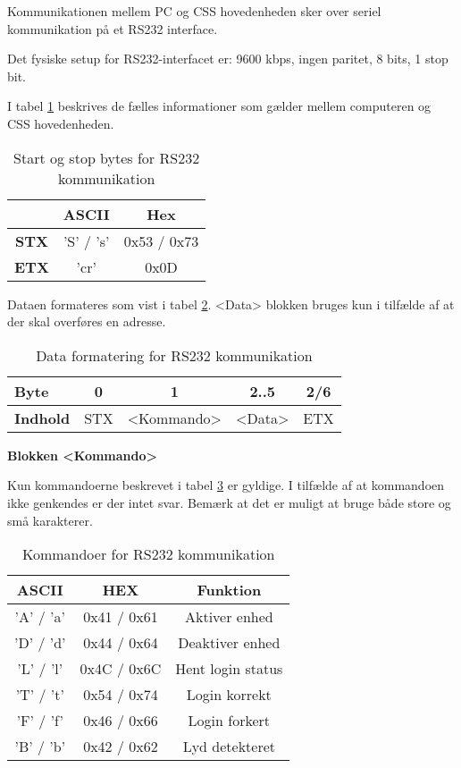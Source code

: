 Kommunikationen mellem PC og CSS hovedenheden sker over seriel kommunikation på et RS232 interface.

Det fysiske setup for RS232-interfacet er: 9600 kbps, ingen paritet, 8 bits, 1 stop bit.

I tabel \ref{table:RS232StartStopBytes} beskrives de fælles informationer som gælder mellem computeren og CSS hovedenheden.

\begin{table}[h]
	\caption{Start og stop bytes for RS232 kommunikation}
	\centering
	\begin{tabular}{|c|c|c|}
		\hline 
		& \textbf{ASCII} & \textbf{Hex} \\ 
		\hline 
		\textbf{STX} & 'S' / 's' & 0x53 / 0x73 \\ 
		\hline 
		\textbf{ETX} & 'cr' & 0x0D \\ 
		\hline 
	\end{tabular} 
	\label{table:RS232StartStopBytes}
\end{table}


Dataen formateres som vist i tabel \ref{table:RS232DataFormat}. <Data> blokken bruges kun i tilfælde af at der skal overføres en adresse.

\begin{table}[h]
	\caption{Data formatering for RS232 kommunikation}
	\centering
	\begin{tabular}{|l|c|c|c|c|}
		\hline 
		\textbf{Byte} & 0 & 1 & 2..5 & 2/6 \\ 
		\hline 
		\textbf{Indhold} & STX & <Kommando> & <Data> & ETX \\ 
		\hline 
	\end{tabular} 
	\label{table:RS232DataFormat}
\end{table}

\textbf{Blokken <Kommando>}

Kun kommandoerne beskrevet i tabel \ref{tabel:RS232Kommandoer} er gyldige. I tilfælde af at kommandoen ikke genkendes er der intet svar. Bemærk at det er muligt at bruge både store og små karakterer.

\begin{table}[h]
\caption{Kommandoer for RS232 kommunikation}
\centering
\begin{tabular}{|c|c|c|}
\hline 
\textbf{ASCII} & \textbf{HEX} & \textbf{Funktion} \\ 
\hline 
'A' / 'a' & 0x41 / 0x61 & Aktiver enhed \\ 
\hline 
'D' / 'd' & 0x44 / 0x64 & Deaktiver enhed \\ 
\hline 
'L' / 'l' & 0x4C / 0x6C & Hent login status \\ 
\hline 
'T' / 't' & 0x54 / 0x74 & Login korrekt \\ 
\hline 
'F' / 'f' & 0x46 / 0x66 & Login forkert \\ 
\hline
'B' / 'b' & 0x42 / 0x62 & Lyd detekteret \\ 
\hline
\end{tabular}
\label{tabel:RS232Kommandoer}
\end{table} 

